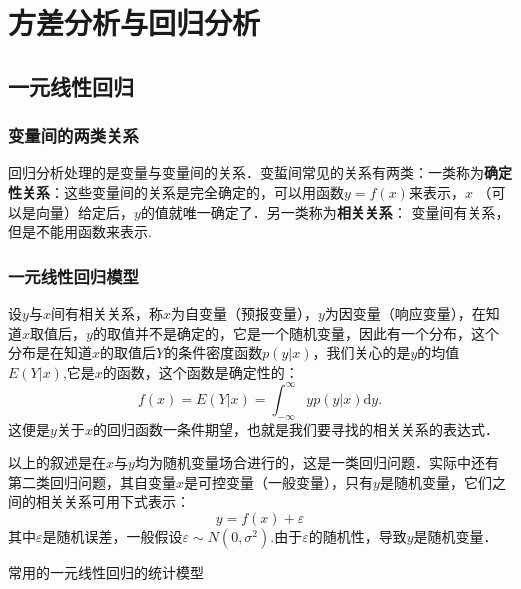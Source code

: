 \chapter{方差分析与回归分析}
\setcounter{section}{3}
\section{一元线性回归}
\subsection{变量间的两类关系}
回归分析处理的是变量与变量间的关系．变蜇间常见的关系有两类：一类称为\textbf{确定性关系}：这些变量间的关系是完全确定的，可以用函数$y=f(x)$来表示，$x$ （可以是向量）给定后，$y$的值就唯一确定了．另一类称为\textbf{相关关系}： 变量间有关系，但是不能用函数来表示.
\subsection{一元线性回归模型}
设$y$与$x$间有相关关系，称$x$为自变量（预报变量），$y$为因变量（响应变量），在知道$x$取值后，$y$的取值并不是确定的，它是一个随机变量，因此有一个分布，这个分布是在知道$x$的取值后$Y$的条件密度函数$p(y|x)$，我们关心的是$y$的均值$E(Y|x)$,它是$x$的函数，这个函数是确定性的：
\begin{equation}
    f(x)=E\left(Y|x\right)=\int_{-\infty}^{\infty}yp(y|x)\mathrm{d}y.
\end{equation}
这便是$y$关于$x$的回归函数一条件期望，也就是我们要寻找的相关关系的表达式．

以上的叙述是在$x$与$y$均为随机变量场合进行的，这是一类回归问题．实际中还有第二类回归问题，其自变量$x$是可控变量（一般变量），只有$y$是随机变量，它们之间的相关关系可用下式表示：
$$
    y = f(x)+\varepsilon
$$
其中$\varepsilon$是随机误差，一般假设$\varepsilon \sim N(0,\sigma^2)$.由于$\varepsilon$的随机性，导致$y$是随机变量．

常用的一元线性回归的统计模型

